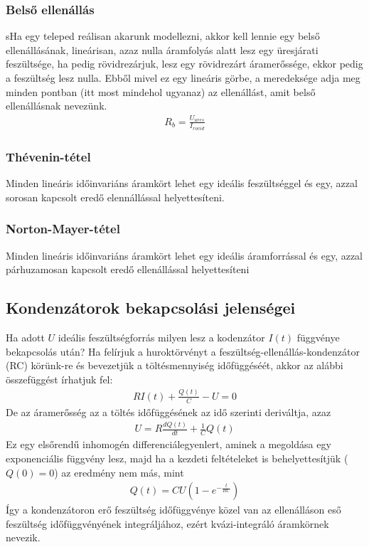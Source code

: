 \documentclass{article}
\begin{document}
\subsubsection{Belső ellenállás}
sHa egy teleped reálisan akarunk modellezni, akkor kell lennie egy belső ellenállásának, lineárisan, azaz nulla áramfolyás alatt lesz egy üresjárati feszültsége, ha pedig rövidrezárjuk, lesz egy rövidrezárt áramerőssége, ekkor pedig a feszültség lesz nulla. Ebből mivel ez egy lineáris görbe, a meredeksége adja meg minden pontban (itt most mindehol ugyanaz) az ellenállást, amit belső ellenállásnak nevezünk.
\begin{gather*}
R_b = \frac{U_{ures}}{I_{rovid}}
\end{gather*}
\subsubsection{Thévenin-tétel}
\begin{center}
Minden lineáris időinvariáns áramkört lehet egy ideális feszültséggel és egy, azzal sorosan kapcsolt eredő elennállással helyettesíteni.
\end{center}
\subsubsection{Norton-Mayer-tétel}
\begin{center}
Minden lineáris időinvariáns áramkört lehet egy ideális áramforrással és egy, azzal párhuzamosan kapcsolt eredő ellenállással helyettesíteni
\end{center}

\subsection{Kondenzátorok bekapcsolási jelenségei}
Ha adott $U$ ideális feszültségforrás milyen lesz a kodenzátor $I(t)$ függvénye bekapcsolás után?
Ha felírjuk a huroktörvényt a feszültség-ellenállás-kondenzátor (RC) körünk-re és bevezetjük a töltésmennyiség időfüggéséét, akkor az alábbi összefüggést írhatjuk fel:
\begin{gather*}
RI(t)+ \frac{Q(t)}{C}-U=0
\end{gather*}
De az áramerősség az a töltés időfüggésének az idő szerinti deriváltja, azaz 
\begin{gather*}
U=R\frac{dQ(t)}{dt} + \frac{1}{C}Q(t)
\end{gather*}
Ez egy elsőrendű inhomogén differenciálegyenlert, aminek a megoldása egy exponenciális függvény lesz, majd ha a kezdeti feltételeket is behelyettesítjük ($Q(0)=0$) az eredmény nem más, mint
\begin{gather*}
Q(t)=CU\left( 1-e^{-\frac{t}{RC}}\right)
\end{gather*}
Így a kondenzátoron erő feszültség időfüggvénye közel van az ellenálláson eső feszültség időfüggvényének integráljához, ezért kvázi-integráló áramkörnek nevezik.
\end{document}
